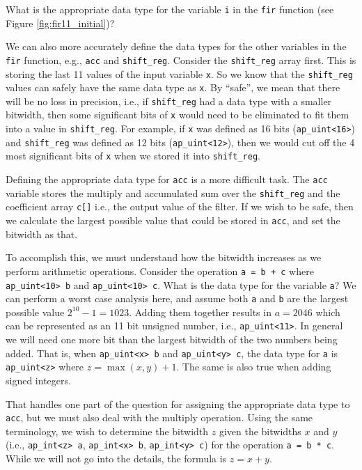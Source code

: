 \begin{exercise}
What is the appropriate data type for the variable \lstinline{i} in the \lstinline{fir} function (see Figure \ref{fig:fir11_initial})?
\end{exercise}

We can also more accurately define the data types for the other variables in the \lstinline{fir} function, e.g., \lstinline{acc} and \lstinline{shift_reg}. Consider the \lstinline{shift_reg} array first. This is storing the last 11 values of the input variable \lstinline{x}. So we know that the \lstinline{shift_reg} values can safely have the same data type as \lstinline{x}. By ``safe'', we mean that there will be no loss in precision, i.e., if \lstinline{shift_reg} had a data type with a smaller bitwidth, then some significant bits of \lstinline{x} would need to be eliminated to fit them into a value in \lstinline{shift_reg}. For example, if \lstinline{x} was defined as 16 bits (\lstinline{ap_uint<16>}) and \lstinline{shift_reg} was defined as 12 bits (\lstinline{ap_uint<12>}), then we would cut off the 4 most significant bits of \lstinline{x} when we stored it into \lstinline{shift_reg}. 

Defining the appropriate data type for \lstinline{acc} is a more difficult task. The \lstinline{acc} variable stores the multiply and accumulated sum over the \lstinline{shift_reg} and the coefficient array \lstinline{c[]} i.e., the output value of the filter. If we wish to be safe, then we calculate the largest possible value that could be stored in \lstinline{acc}, and set the bitwidth as that. 

To accomplish this, we must understand how the bitwidth increases as we perform arithmetic operations. Consider the operation \lstinline{a = b + c} where \lstinline{ap_uint<10> b} and \lstinline{ap_uint<10> c}. What is the data type for the variable \lstinline{a}? We can perform a worst case analysis here, and assume both \lstinline{a} and \lstinline{b} are the largest possible value $2^{10}-1 = 1023$. Adding them together results in $a = 2046$ which can be represented as an 11 bit unsigned number, i.e., \lstinline{ap_uint<11>}. In general we will need one more bit than the largest bitwidth of the two numbers being added. That is, when  \lstinline{ap_uint<x> b} and \lstinline{ap_uint<y> c}, the data type for \lstinline{a} is \lstinline{ap_uint<z>} where $z = \max(x,y) + 1$. The same is also true when adding signed integers. 

That handles one part of the question for assigning the appropriate data type to \lstinline{acc}, but we must also deal with the multiply operation. Using the same terminology, we wish to determine the bitwidth $z$ given the bitwidths $x$ and $y$ (i.e., \lstinline{ap_int<z> a}, \lstinline{ap_int<x> b}, \lstinline{ap_int<y> c}) for the operation \lstinline{a = b * c}. While we will not go into the details, the formula is $z = x + y$. 

